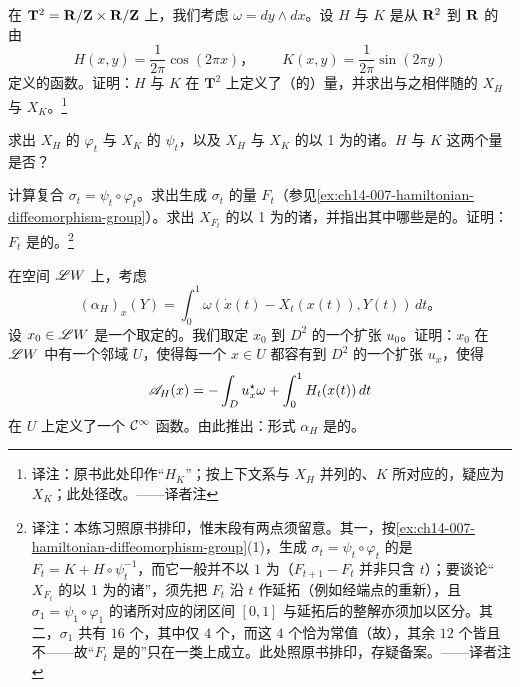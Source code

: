 \begin{exercise}\label{ex:ch14-025-torus-hamiltonians}
在\trTorus{} $\mathbf{T}^2=\mathbf{R}/\mathbf{Z}\times\mathbf{R}/\mathbf{Z}$ 上，我们考虑\trSymplecticForm{} $\omega=dy\wedge dx$。设 $H$ 与 $K$ 是从 $\mathbf{R}^2$ 到 $\mathbf{R}$ 的由
\[
H(x,y)=\frac{1}{2\pi}\cos(2\pi x)\text{，}\qquad
K(x,y)=\frac{1}{2\pi}\sin(2\pi y)
\]
定义的函数。证明：$H$ 与 $K$ 在 $\mathbf{T}^2$ 上定义了（\trAutonomous{}的）\trHamiltonian{}量，并求出与之相伴随的\trHamiltonian\trVectorField{} $X_H$ 与 $X_K$。\footnote{译注：原书此处印作“$H_K$”；按上下文系与 $X_H$ 并列的、$K$ 所对应的\trHamiltonian\trVectorField，疑应为 $X_K$；此处径改。——译者注}

求出 $X_H$ 的\trFlow{} $\varphi_t$ 与 $X_K$ 的\trFlow{} $\psi_t$，以及 $X_H$ 与 $X_K$ 的以 1 为\trPeriodic{}的诸\trPeriodic\trTrajectory。$H$ 与 $K$ 这两个\trHamiltonian{}量是否\trNondegenerate{}？

计算复合 $\sigma_t=\psi_t\circ\varphi_t$。求出生成\trHamiltonian\trIsotopy{} $\sigma_t$ 的\trHamiltonian{}量 $F_t$（参见\cref{ex:ch14-007-hamiltonian-diffeomorphism-group}）。求出 $X_{F_t}$ 的以 1 为\trPeriodic{}的诸\trPeriodic\trTrajectory，并指出其中哪些是\trContractible{}的。证明：$F_t$ 是\trNondegenerate{}的。\footnote{译注：本练习照原书排印，惟末段有两点须留意。其一，按\cref{ex:ch14-007-hamiltonian-diffeomorphism-group}(1)，生成 $\sigma_t=\psi_t\circ\varphi_t$ 的是 $F_t=K+H\circ\psi_t^{-1}$，而它一般并不以 $1$ 为\trPeriodic（$F_{t+1}-F_t$ 并非只含 $t$）；要谈论“$X_{F_t}$ 的以 1 为\trPeriodic{}的诸\trPeriodic\trTrajectory”，须先把 $F_t$ 沿 $t$ 作\trPeriodic{}延拓（例如经端点的重新\trParametrization），且 $\sigma_1=\psi_1\circ\varphi_1$ 的诸\trFixedPoint{}所对应的闭区间 $[0,1]$ \trTrajectory{}与延拓后的整\trPeriodic{}解亦须加以区分。其二，$\sigma_1$ 共有 $16$ 个\trFixedPoint，其中仅 $4$ 个\trNondegenerate，而这 $4$ 个恰为常值\trTrajectory（故\trContractible{}），其余 $12$ 个皆\trDegenerate{}且不\trContractible——故“$F_t$ 是\trNondegenerate{}的”只在\trContractible\trTrajectory{}一类上成立。此处照原书排印，存疑备案。——译者注}
\end{exercise}

\begin{exercise}\label{ex:ch14-026-action-form-closed}
在空间 $\mathscr{L}W$ 上，考虑\trActionForm
\[
(\alpha_H)_x(Y)=\int_0^1\omega(\dot{x}(t)-X_t(x(t)),Y(t))\,dt\text{。}
\]
设 $x_0\in\mathscr{L}W$ 是一个取定的\trLoop。我们取定 $x_0$ 到\trDisk{} $D^2$ 的一个扩张 $u_0$。证明：$x_0$ 在 $\mathscr{L}W$ 中有一个邻域 $U$，使得每一个\trLoop{} $x\in U$ 都容有到\trDisk{} $D^2$ 的一个扩张 $u_x$，使得
\[
\mathscr{A}_H(x)=-\int_D u_x^\star\omega+\int_0^1H_t(x(t))\,dt
\]
在 $U$ 上定义了一个 $\mathcal{C}^\infty$ 函数。由此推出：形式 $\alpha_H$ 是\trClosed{}的。
\end{exercise}

